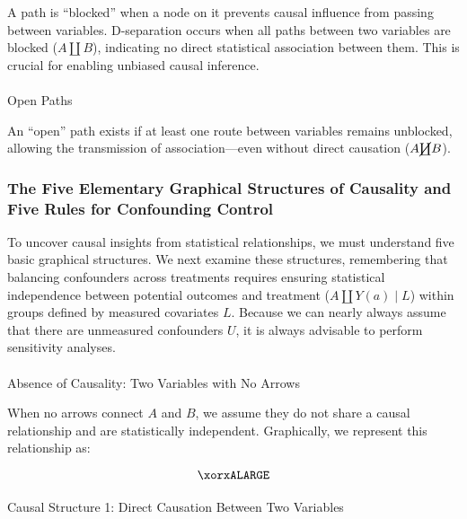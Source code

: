 \documentclass[
  singlecolumn]{article}
\makeatletter
\let\oldparagraph\paragraph
\renewcommand{\paragraph}{
    \@ifstar
      \xxxParagraphStar
      \xxxParagraphNoStar
  }
\newcommand{\xxxParagraphStar}[1]{\oldparagraph*{#1}\mbox{}}
\newcommand{\xxxParagraphNoStar}[1]{\oldparagraph{#1}\mbox{}}
\makeatother
\begin{document}
A path is ``blocked'' when a node on it prevents causal influence from
passing between variables. D-separation occurs when all paths between
two variables are blocked (\(A \coprod B\)), indicating no direct
statistical association between them. This is crucial for enabling
unbiased causal inference.

\paragraph{Open Paths}\label{open-paths}

An ``open'' path exists if at least one route between variables remains
unblocked, allowing the transmission of association---even without
direct causation (\(A \cancel\coprod B\)).

\subsubsection{The Five Elementary Graphical Structures of Causality and
Five Rules for Confounding Control}\label{sec-five-elementary}

To uncover causal insights from statistical relationships, we must
understand five basic graphical structures. We next examine these
structures, remembering that balancing confounders across treatments
requires ensuring statistical independence between potential outcomes
and treatment (\(A \coprod Y(a) \mid L\)) within groups defined by
measured covariates \(L\). Because we can nearly always assume that
there are unmeasured confounders \(U\), it is always advisable to
perform sensitivity analyses.

\paragraph{Absence of Causality: Two Variables with No
Arrows}\label{absence-of-causality-two-variables-with-no-arrows}

When no arrows connect \(A\) and \(B\), we assume they do not share a
causal relationship and are statistically independent. Graphically, we
represent this relationship as:

\[
\xorxALARGE
\]

\paragraph{Causal Structure 1: Direct Causation Between Two
Variables}\label{causal-structure-1-direct-causation-between-two-variables}
\end{document}
